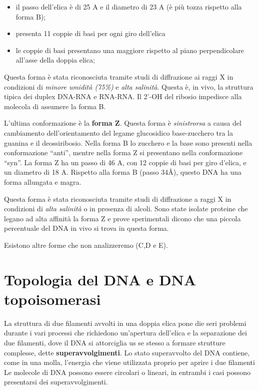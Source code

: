 \documentclass[11pt]{book}
\begin{document}
\begin{itemize}
\itemsep1pt\parskip0pt
\item
  il passo dell'elica è di 25 A e il diametro di 23 A (è più tozza
  rispetto alla forma B);
\item
  presenta 11 coppie di basi per ogni giro dell'elica
\item
  le coppie di basi presentano una maggiore rispetto al piano
  perpendicolare all'asse della doppia elica;
\end{itemize}

Questa forma è stata riconosciuta tramite studi di diffrazione ai raggi
X in condizioni di \emph{minore umidità (75\%)} e \emph{alta salinità}.
Questa è, in vivo, la struttura tipica dei duplex DNA-RNA e RNA-RNA. Il
2'-OH del ribosio impedisce alla molecola di assumere la forma B.

L'ultima conformazione è la \textbf{forma Z}. Questa forma è
\emph{sinistrorsa} a causa del cambiamento dell'orientamento del legame
glucosidico base-zucchero tra la guanina e il deossiribosio. Nella forma
B lo zucchero e la base sono presenti nella conformazione ``anti'',
mentre nella forma Z si presentano nella conformazione ``syn''. La forma
Z ha un passo di 46 A, con 12 coppie di basi per giro d'elica, e un
diametro di 18 A. Rispetto alla forma B (passo 34Å), questo DNA ha una
forma allungata e magra.

Questa forma è stata riconosciuta tramite studi di diffrazione a raggi X
in condizioni di \emph{alta salinità} o in presenza di alcoli. Sono
state isolate proteine che legano ad alta affinità la forma Z e prove
sperimentali dicono che una piccola percentuale del DNA in vivo si trova
in questa forma.

Esistono altre forme che non analizzeremo (C,D e E).

\section{Topologia del DNA e DNA
topoisomerasi}\label{topologia-del-dna-e-dna-topoisomerasi}

La struttura di due filamenti avvolti in una doppia elica pone die seri
problemi durante i vari processi che richiedono un'apertura dell'elica e
la separazione dei due filamenti, dove il DNA si attorciglia us se
stesso a formare strutture complesse, dette \textbf{superavvolgimenti}.
Lo stato superavvolto del DNA contiene, come in una molla, l'energia che
viene utilizzata proprio per aprire i due filamenti Le molecole di DNA
possono essere circolari o lineari, in entrambi i casi possono
presentarsi dei superavvolgimenti.
\end{document}
